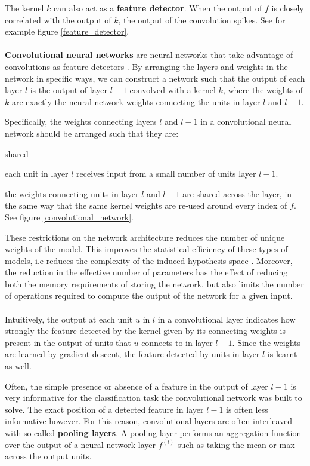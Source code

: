 The kernel $k$ can also act as a \textbf{feature detector}. When the output of $f$ is closely correlated with the output of $k$, the output of the convolution spikes. See for example figure \ref{feature_detector}.
\\\\
\textbf{Convolutional neural networks} are neural networks that take advantage of convolutions as feature detectors \citep{lecun1989}. By arranging the layers and weights in the network in specific ways, we can construct a network such that the output of each layer $l$ is the output of layer $l - 1$ convolved with a kernel $k$, where the weights of $k$ are exactly the neural network weights connecting the units in layer $l$ and $l - 1$.

Specifically, the weights connecting layers $l$ and $l - 1$ in a convolutional neural network should be arranged such that they are:

\begin{labeling}{shared}
	\item [\textbf{sparse}] each unit in layer $l$ receives input from a small number of units layer $l - 1$.
	\item [\textbf{shared}] the weights connecting units in layer $l$ and $l - 1$ are shared across the layer, in the same way that the same kernel weights are re-used around every index of $f$. See figure \ref{convolutional_network}.
\end{labeling}

These restrictions on the network architecture reduces the number of unique weights of the model. This improves the statistical efficiency of these types of models, i.e reduces the complexity of the induced hypothesis space \citep{goodfellow16}. Moreover, the reduction in the effective number of parameters has the effect of reducing both the memory requirements of storing the network, but also limits the number of operations required to compute the output of the network for a given input.
\\\\
Intuitively, the output at each unit $u$ in $l$ in a convolutional layer indicates how strongly the feature detected by the kernel given by its connecting weights is present in the output of units that $u$ connects to in layer $l - 1$. Since the weights are learned by gradient descent, the feature detected by units in layer $l$ is learnt as well.

Often, the simple presence or absence of a feature in the output of layer $l - 1$ is very informative for the classification task the convolutional network was built to solve. The exact position of a detected feature in layer $l - 1$ is often less informative however. For this reason, convolutional layers are often interleaved with so called \textbf{pooling layers}. A pooling layer performs an aggregation function over the output of a neural network layer $f^{(l)}$ such as taking the mean or max across the output units.

